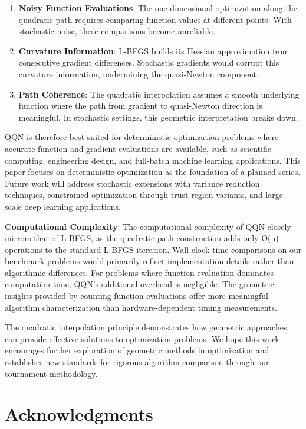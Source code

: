 \begin{enumerate}
\def\labelenumi{\arabic{enumi}.}
\item
  \textbf{Noisy Function Evaluations}: The one-dimensional optimization along the quadratic path requires comparing function values at different points.
  With stochastic noise, these comparisons become unreliable.
\item
  \textbf{Curvature Information}: L-BFGS builds its Hessian approximation from consecutive gradient differences.
  Stochastic gradients would corrupt this curvature information, undermining the quasi-Newton component.
\item
  \textbf{Path Coherence}: The quadratic interpolation assumes a smooth underlying function where the path from gradient to quasi-Newton direction is meaningful.
  In stochastic settings, this geometric interpretation breaks down.
\end{enumerate}

QQN is therefore best suited for deterministic optimization problems where accurate function and gradient evaluations are available, such as scientific computing, engineering design, and full-batch machine learning applications. This paper focuses on deterministic optimization as the foundation of a planned series. Future work will address stochastic extensions with variance reduction techniques, constrained optimization through trust region variants, and large-scale deep learning applications.

\textbf{Computational Complexity}: The computational complexity of QQN closely mirrors that of L-BFGS, as the quadratic path construction adds only O(n) operations to the standard L-BFGS iteration.
Wall-clock time comparisons on our benchmark problems would primarily reflect implementation details rather than algorithmic differences.
For problems where function evaluation dominates computation time, QQN's additional overhead is negligible.
The geometric insights provided by counting function evaluations offer more meaningful algorithm characterization than hardware-dependent timing measurements.

The quadratic interpolation principle demonstrates how geometric approaches can provide effective solutions to optimization problems.
We hope this work encourages further exploration of geometric methods in optimization and establishes new standards for rigorous algorithm comparison through our tournament methodology.

\hypertarget{acknowledgments}{%
\section{Acknowledgments}\label{acknowledgments}}


